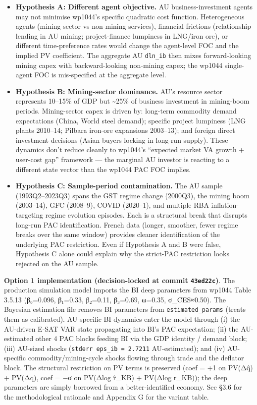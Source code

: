 \documentclass[
]{article}
\providecommand{\tightlist}{%
  \setlength{\itemsep}{0pt}\setlength{\parskip}{0pt}}
\begin{document}
\begin{itemize}
\tightlist
\item
  \textbf{Hypothesis A: Different agent objective.} AU
  business-investment agents may not minimise wp1044's specific
  quadratic cost function. Heterogeneous agents (mining sector vs
  non-mining services), financial frictions (relationship lending in AU
  mining; project-finance lumpiness in LNG/iron ore), or different
  time-preference rates would change the agent-level FOC and the implied
  PV coefficient. The aggregate AU \texttt{dln\_ib} then mixes
  forward-looking mining capex with backward-looking non-mining capex;
  the wp1044 single-agent FOC is mis-specified at the aggregate level.
\item
  \textbf{Hypothesis B: Mining-sector dominance.} AU's resource sector
  represents 10--15\% of GDP but \textasciitilde25\% of business
  investment in mining-boom periods. Mining-sector capex is driven by:
  long-term commodity demand expectations (China, World steel demand);
  specific project lumpiness (LNG plants 2010--14; Pilbara iron-ore
  expansions 2003--13); and foreign direct investment decisions (Asian
  buyers locking in long-run supply). These dynamics don't reduce
  cleanly to wp1044's ``expected market VA growth + user-cost gap''
  framework --- the marginal AU investor is reacting to a different
  state vector than the wp1044 PAC FOC implies.
\item
  \textbf{Hypothesis C: Sample-period contamination.} The AU sample
  (1993Q2--2023Q3) spans the GST regime change (2000Q3), the mining boom
  (2003--14), GFC (2008--9), COVID (2020--1), and multiple RBA
  inflation-targeting regime evolution episodes. Each is a structural
  break that disrupts long-run PAC identification. French data (longer,
  smoother, fewer regime breaks over the same window) provides cleaner
  identification of the underlying PAC restriction. Even if Hypothesis A
  and B were false, Hypothesis C alone could explain why the strict-PAC
  restriction looks rejected on the AU sample.
\end{itemize}

\textbf{Option 1 implementation (decision-locked at commit
\texttt{43ed22c})}. The production simulation model imports the BI deep
parameters from wp1044 Table 3.5.13 (β₀=0.096, β₁=0.33, β₂=0.11,
β₃=0.69, ω=0.35, σ\_CES≈0.50). The Bayesian estimation file removes BI
parameters from \texttt{estimated\_params} (treats them as calibrated).
AU-specific BI dynamics enter the model through (i) the AU-driven E-SAT
VAR state propagating into BI's PAC expectation; (ii) the AU-estimated
other 4 PAC blocks feeding BI via the GDP identity / demand block; (iii)
AU-sized shocks (\texttt{stderr\ eps\_ib\ =\ 2.7211} AU-estimated); and
(iv) AU-specific commodity/mining-cycle shocks flowing through trade and
the deflator block. The structural restriction on PV terms is preserved
(coef = +1 on PV(Δq̂) + PV(Δq̄), coef = −σ on PV(Δlog r̂\_KB) + PV(Δlog
r̄\_KB)); the deep parameters are simply borrowed from a
better-identified economy. See §3.6 for the methodological rationale and
Appendix G for the variant table.
\end{document}
